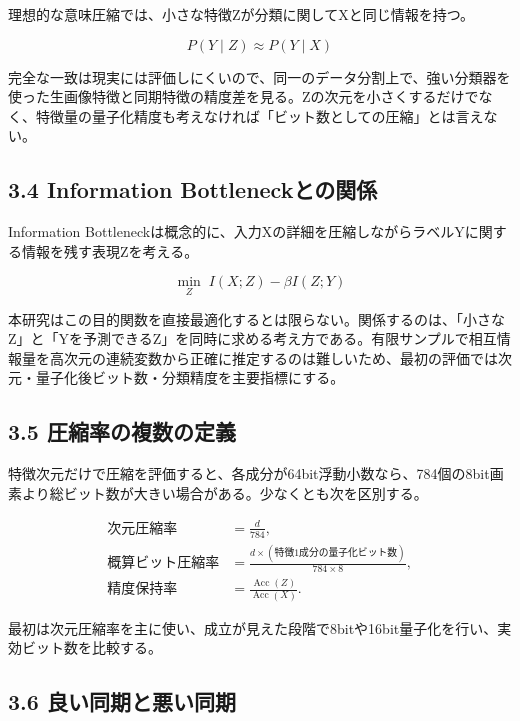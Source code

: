 \documentclass[11pt,a4paper]{ltjsarticle}
\begin{document}
理想的な意味圧縮では、小さな特徴Zが分類に関してXと同じ情報を持つ。\par

\[
P(Y\mid Z)\approx P(Y\mid X)
\]

完全な一致は現実には評価しにくいので、同一のデータ分割上で、強い分類器を使った生画像特徴と同期特徴の精度差を見る。Zの次元を小さくするだけでなく、特徴量の量子化精度も考えなければ「ビット数としての圧縮」とは言えない。\par

\subsection*{\textcolor{researchblue}{3.4 Information Bottleneckとの関係}}

Information Bottleneckは概念的に、入力Xの詳細を圧縮しながらラベルYに関する情報を残す表現Zを考える。\par

\[
\min_{Z}\; I(X;Z)-\beta I(Z;Y)
\]

本研究はこの目的関数を直接最適化するとは限らない。関係するのは、「小さなZ」と「Yを予測できるZ」を同時に求める考え方である。有限サンプルで相互情報量を高次元の連続変数から正確に推定するのは難しいため、最初の評価では次元・量子化後ビット数・分類精度を主要指標にする。\par

\subsection*{\textcolor{researchblue}{3.5 圧縮率の複数の定義}}

特徴次元だけで圧縮を評価すると、各成分が64bit浮動小数なら、784個の8bit画素より総ビット数が大きい場合がある。少なくとも次を区別する。\par

\[
\begin{aligned}
\text{次元圧縮率}
&=\frac{d}{784},\\[2mm]
\text{概算ビット圧縮率}
&=\frac{d\times(\text{特徴1成分の量子化ビット数})}{784\times 8},\\[2mm]
\text{精度保持率}
&=\frac{\operatorname{Acc}(Z)}{\operatorname{Acc}(X)}.
\end{aligned}
\]

最初は次元圧縮率を主に使い、成立が見えた段階で8bitや16bit量子化を行い、実効ビット数を比較する。\par

\subsection*{\textcolor{researchblue}{3.6 良い同期と悪い同期}}
\end{document}

